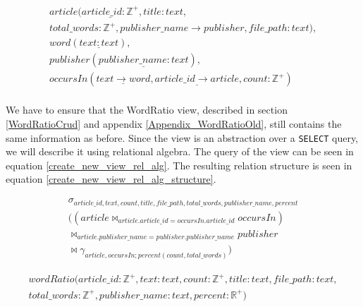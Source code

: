 \begin{equation}\label{eq:newDatabaseRelationalModel}
    \begin{split}
        article(\underline{article\_id: \mathbb{Z^+}}, title:text,\\ total\_words:\mathbb{Z^+}, publisher\_name \rightarrow publisher, file\_path:text), \\
        word(\underline{text:text}),\\
        publisher(\underline{publisher\_name:text}),\\
        occursIn(\underline{text \rightarrow word}, \underline{article\_id \rightarrow article}, count:\mathbb{Z^+})\\
    \end{split}
\end{equation}


We have to ensure that the WordRatio view, described in section \ref{WordRatioCrud} and appendix \ref{Appendix_WordRatioOld}, still contains the same information as before.
Since the view is an abstraction over a \texttt{SELECT} query, we will describe it using relational algebra.
The query of the view can be seen in equation \ref{create_new_view_rel_alg}.
The resulting relation structure is seen in equation \ref{create_new_view_rel_alg_structure}.


\begin{equation}\label{create_new_view_rel_alg}
    \begin{split}
        \sigma_{article\_id, text, count,title, file\_path, total\_words, publisher\_name, percent} \\
        ((article \Join_{article.article\_id = occursIn.article\_id} occursIn) \\
        \Join_{article.publisher\_name = publisher.publisher\_name} publisher\\
        \Join \gamma_{article, occursIn;percent(count, total\_words)})
    \end{split}
\end{equation}

\begin{equation}\label{create_new_view_rel_alg_structure}
    \begin{split}
        wordRatio(article\_id:\mathbb{Z^+}, text:text, count:\mathbb{Z^+},title:text, file\_path:text,\\ total\_words:\mathbb{Z^+}, publisher\_name:text, percent:\mathbb{R^+})
    \end{split}
\end{equation}
